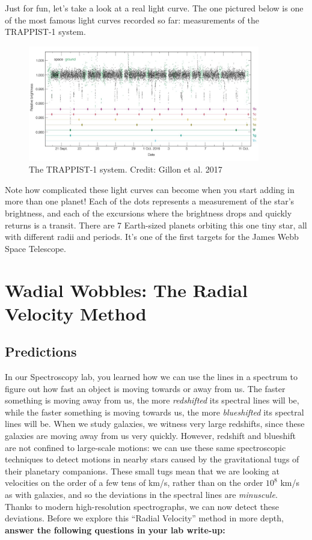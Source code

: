 \documentclass[11pt]{article}
\begin{document}
\noindent
Just for fun, let's take a look at a real light curve. The one pictured below is one of the most famous light curves recorded so far: measurements of the TRAPPIST-1 system. 

\begin{figure}[h!]
    \centering
    \includegraphics[width=0.9\textwidth]{Images/trappist1.png}
    \caption{The TRAPPIST-1 system. Credit: Gillon et al. 2017}
    \label{fig:transits}
\end{figure}

\medskip \noindent
Note how complicated these light curves can become when you start adding in more than one planet! Each of the dots represents a measurement of the star's brightness, and each of the excursions where the brightness drops and quickly returns is a transit. There are 7 Earth-sized planets orbiting this one tiny star, all with different radii and periods. It's one of the first targets for the James Webb Space Telescope.

\pagebreak
\section{Wadial Wobbles: The Radial Velocity Method}
\subsection{Predictions} \label{sec:RV_predictions}

In our Spectroscopy lab, you learned how we can use the lines in a spectrum to figure out how fast an object is moving towards or away from us. The faster something is moving away from us, the more \textit{redshifted} its spectral lines will be, while the faster something is moving towards us, the more \textit{blueshifted} its spectral lines will be. When we study galaxies, we witness very large redshifts, since these galaxies are moving away from us very quickly. However, redshift and blueshift are not confined to large-scale motions: we can use these same spectroscopic techniques to detect motions in nearby stars caused by the gravitational tugs of their planetary companions. These small tugs mean that we are looking at velocities on the order of a few tens of km/s, rather than on the order $10^8$ km/s as with galaxies, and so the deviations in the spectral lines are \textit{minuscule}. Thanks to modern high-resolution spectrographs, we can now detect these deviations. Before we explore this ``Radial Velocity'' method in more depth, \textbf{answer the following questions in your lab write-up:}
\end{document}
